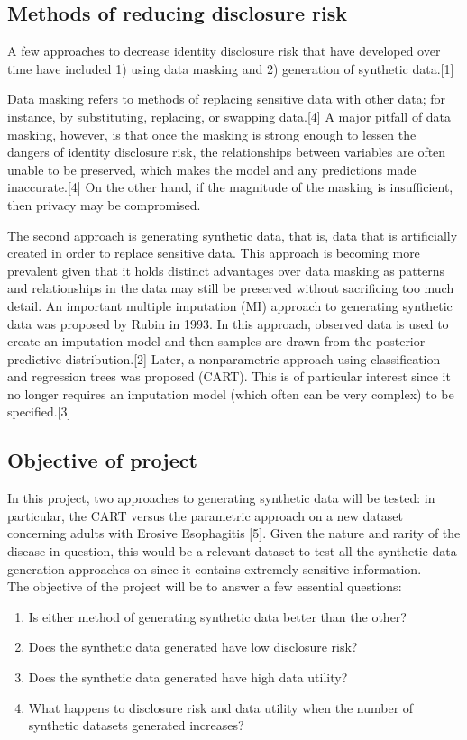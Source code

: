 \documentclass[12pt]{article}
\begin{document}
\subsection*{Methods of reducing disclosure risk}
A few approaches to decrease identity disclosure risk that have developed over time have included 1) using data masking and 2) generation of synthetic data.[1] 

Data masking refers to methods of replacing sensitive data with other data; for instance, by substituting, replacing, or swapping data.[4] A major pitfall of data masking, however, is that once the masking is strong enough to lessen the dangers of identity disclosure risk, the relationships between variables are often unable to be preserved, which makes the model and any predictions made inaccurate.[4] On the other hand, if the magnitude of the masking is insufficient, then privacy may be compromised. 

The second approach is generating synthetic data, that is, data that is artificially created in order to replace sensitive data. This approach is becoming more prevalent given that it holds distinct advantages over data masking as patterns and relationships in the data may still be preserved without sacrificing too much detail. An important multiple imputation (MI) approach to generating synthetic data was proposed by Rubin in 1993. In this approach, observed data is used to create an imputation model and then samples are drawn from the posterior predictive distribution.[2] Later, a nonparametric approach using classification and regression trees was proposed (CART). This is of particular interest since it no longer requires an imputation model (which often can be very complex) to be specified.[3]

\subsection*{Objective of project}
In this project, two approaches to generating synthetic data will be tested: in particular, the CART versus the parametric approach on a new dataset concerning adults with Erosive Esophagitis [5]. 
Given the nature and rarity of the disease in question, this would be a relevant dataset to test all the synthetic data generation approaches on since it contains extremely sensitive information.\\
The objective of the project will be to answer a few essential questions:
\begin{enumerate}
	\item Is either method of generating synthetic data better than the other?
	\item Does the synthetic data generated have low disclosure risk?
	\item Does the synthetic data generated have high data utility?
	\item What happens to disclosure risk and data utility when the number of synthetic datasets generated increases?
\end{enumerate}
\end{document}
